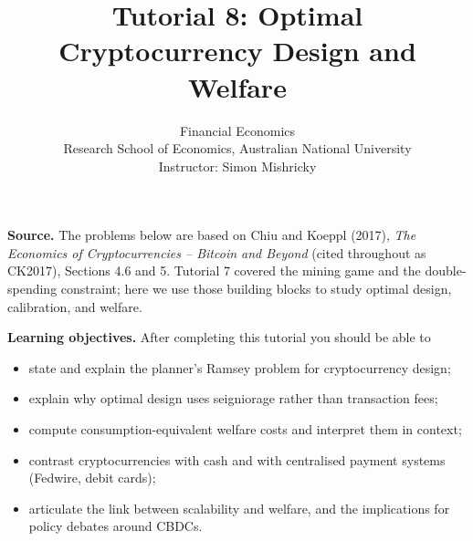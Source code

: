 \documentclass[11pt]{article}
\title{Tutorial 8: Optimal Cryptocurrency Design and Welfare}
\author{Financial Economics \\ Research School of Economics, Australian National University \\
\small Instructor: Simon Mishricky}
\date{}
\begin{document}
\maketitle

\noindent\textbf{Source.} The problems below are based on Chiu and Koeppl (2017),
\emph{The Economics of Cryptocurrencies -- Bitcoin and Beyond} (cited throughout as CK2017),
Sections 4.6 and 5. Tutorial 7 covered the mining game and the double-spending constraint;
here we use those building blocks to study optimal design, calibration, and welfare.

\medskip

\noindent\textbf{Learning objectives.} After completing this tutorial you should be able to
\begin{itemize}
    \item state and explain the planner's Ramsey problem for cryptocurrency design;
    \item explain why optimal design uses seigniorage rather than transaction fees;
    \item compute consumption-equivalent welfare costs and interpret them in context;
    \item contrast cryptocurrencies with cash and with centralised payment systems
          (Fedwire, debit cards);
    \item articulate the link between scalability and welfare, and the implications for
          policy debates around CBDCs.
\end{itemize}

\bigskip
\end{document}
